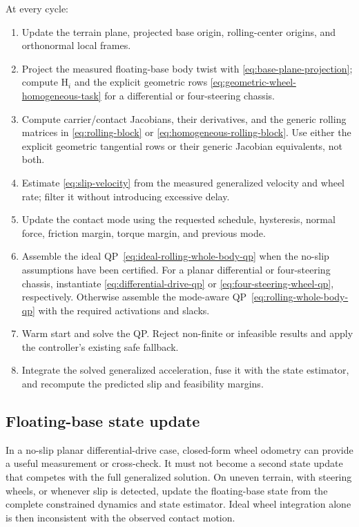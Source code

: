 \documentclass[10pt]{article}
\begin{document}
At every cycle:
\begin{enumerate}
  \item Update the terrain plane, projected base origin, rolling-center
    origins, and orthonormal local frames.
  \item Project the measured floating-base body twist with
    \eqref{eq:base-plane-projection}; compute $\text{H}_i$ and the explicit
    geometric rows \eqref{eq:geometric-wheel-homogeneous-task} for a
    differential or four-steering chassis.
  \item Compute carrier/contact Jacobians, their derivatives, and the generic
    rolling matrices in \eqref{eq:rolling-block} or
    \eqref{eq:homogeneous-rolling-block}. Use either the explicit geometric
    tangential rows or their generic Jacobian equivalents, not both.
  \item Estimate \eqref{eq:slip-velocity} from the measured generalized
    velocity and wheel rate; filter it without introducing excessive delay.
  \item Update the contact mode using the requested schedule, hysteresis,
    normal force, friction margin, torque margin, and previous mode.
  \item Assemble the ideal QP~\eqref{eq:ideal-rolling-whole-body-qp} when the
    no-slip assumptions have been certified. For a planar differential or
    four-steering chassis, instantiate \eqref{eq:differential-drive-qp} or
    \eqref{eq:four-steering-wheel-qp}, respectively. Otherwise assemble the
    mode-aware QP~\eqref{eq:rolling-whole-body-qp} with the required
    activations and slacks.
  \item Warm start and solve the QP. Reject non-finite or infeasible results and
    apply the controller's existing safe fallback.
  \item Integrate the solved generalized acceleration, fuse it with the state
    estimator, and recompute the predicted slip and feasibility margins.
\end{enumerate}

\subsection{Floating-base state update}

In a no-slip planar differential-drive case, closed-form wheel odometry can
provide a useful measurement or cross-check. It must not become a second state
update that competes with the full generalized solution. On uneven terrain,
with steering wheels, or whenever slip is detected, update the floating-base
state from the complete constrained dynamics and state estimator. Ideal wheel
integration alone is then inconsistent with the observed contact motion.
\end{document}
